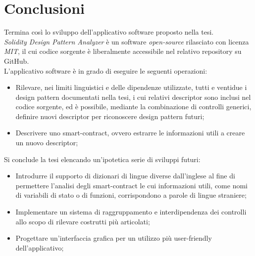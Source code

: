 \chapter{Conclusioni}
Termina così lo sviluppo dell'applicativo software proposto nella tesi.\\
\newline
\textit{Solidity Design Pattern Analyzer} è un software \textit{open-source} rilasciato con licenza \textit{MIT}, il cui codice sorgente è liberalmente accessibile nel relativo repository su GitHub\cite{github-repo}.\\
\newline
L'applicativo software è in grado di eseguire le seguenti operazioni:
\begin{itemize}
	\item Rilevare, nei limiti linguistici e delle dipendenze utilizzate, tutti e ventidue i design pattern documentati nella tesi, i cui relativi descriptor sono inclusi nel codice sorgente, ed è possibile, mediante la combinazione di controlli generici, definire nuovi descriptor per riconoscere design pattern futuri;
	\item Descrivere uno smart-contract, ovvero estrarre le informazioni utili a creare un nuovo descriptor;
\end{itemize} 
Si conclude la tesi elencando un'ipotetica serie di sviluppi futuri:
\begin{itemize}
	\item Introdurre il supporto di dizionari di lingue diverse dall'inglese al fine di permettere l'analisi degli smart-contract le cui informazioni utili, come nomi di variabili di stato o di funzioni, corrispondono a parole di lingue straniere;
	\item Implementare un sistema di raggruppamento e interdipendenza dei controlli allo scopo di rilevare costrutti più articolati;
	\item Progettare un'interfaccia grafica per un utilizzo più user-friendly dell'applicativo;
\end{itemize}
 
 